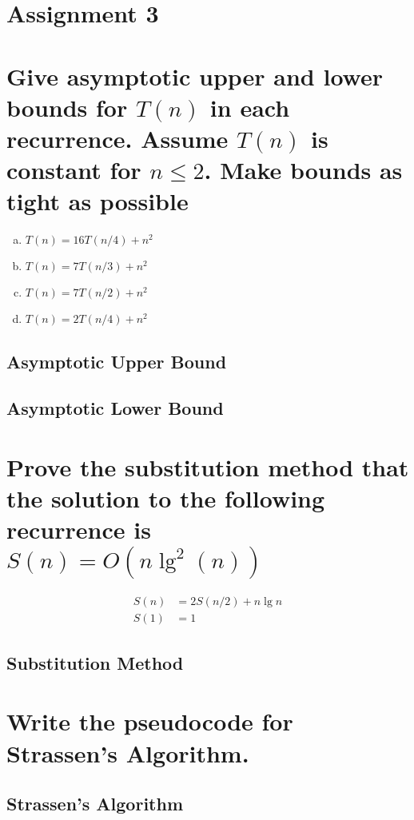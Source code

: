 
\section*{\Huge\bfseries Assignment 3}
\section{Give asymptotic upper and lower bounds for $T(n)$ in each recurrence. Assume $T(n)$ is constant for $n \leq 2$. Make bounds as tight as possible}
\begin{enumerate}[a.]
	\item $T(n) = 16	T(n/4) + n^2$
	\item $T(n) = 7		T(n/3) + n^2$
	\item $T(n) = 7		T(n/2) + n^2$
	\item $T(n) = 2		T(n/4) + n^2$
\end{enumerate}

\subsection{Asymptotic Upper Bound}
\subsection{Asymptotic Lower Bound}

\section{Prove the substitution method that the solution to the following recurrence is $S(n) = O(n\lg^2(n))$}
\begin{align*}
	S(n) &= 2S(n/2) + n \lg n \\
	S(1) &= 1
\end{align*}
\subsection{Substitution Method}

\section{Write the pseudocode for Strassen's Algorithm.}
\subsection{Strassen's Algorithm}

